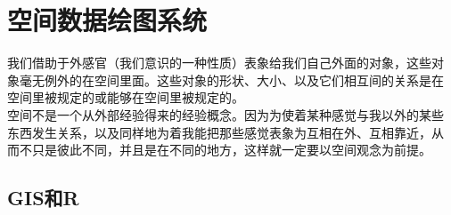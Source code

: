 
\section{空间数据绘图系统}

\begin{frame}[c]{\subsecname}{}
      \begin{ornamentblock}%
\hspace*{2em}我们借助于外感官（我们意识的一种性质）表象给我们自己外面的对象，这些对
象毫无例外的在空间里面。这些对象的形状、大小、以及它们相互间的关系是在
空间里被规定的或能够在空间里被规定的。\\
\hspace*{2em}空间不是一个从外部经验得来的经验概念。因为为使着某种感觉与我以外的某些
东西发生关系，以及同样地为着我能把那些感觉表象为互相在外、互相靠近，从
而不只是彼此不同，并且是在不同的地方，这样就一定要以空间观念为前提。\\
      \end{ornamentblock}
\end{frame}

\subsection{GIS和R}


